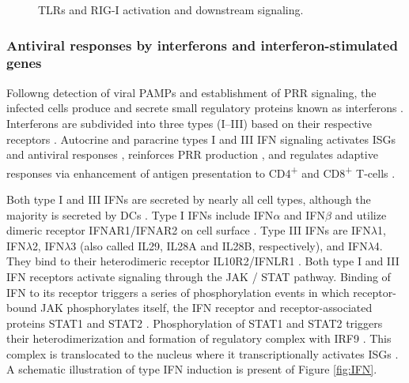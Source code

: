 		\begin{figure}[h]
			\centering
			\caption{\glspl{TLR} and \gls{RIG-I} activation and downstream signaling.} \label{fig:detection}
		\end{figure}	
		
		
		\subsubsection{Antiviral responses by interferons and interferon-stimulated genes}
		
		Followng detection of viral \gls{PAMP}s and establishment of \gls{PRR} signaling, the infected cells produce and secrete small regulatory proteins known as interferons \parencite{Fensterl2009}. Interferons are subdivided into three types (I--III) based on their respective receptors  \parencite{Branca1981, Sheppard2003}. Autocrine and paracrine types I and III \gls{IFN} signaling activates \gls{ISG}s and antiviral responses \parencite{Kotenko2003, Garcia-Sastre2006}, reinforces \gls{PRR} production \parencite{Pothlichet2013}, and regulates adaptive responses via enhancement of antigen presentation to CD4\textsuperscript{+} and CD8\textsuperscript{+} T-cells \parencite{Zietara2009}.
	
		Both type I and III \glspl{IFN} are secreted by nearly all cell types, although the majority is secreted by \glspl{DC} \parencite{Siegal1999, Odendall2014}. Type I \glspl{IFN} include \gls{IFN}$\alpha$ and \gls{IFN}$\beta$ and utilize dimeric receptor IFNAR1/IFNAR2 on cell surface \parencite{Mogensen1999}. Type III \glspl{IFN} are \gls{IFN}$\lambda$1, \gls{IFN}$\lambda$2, \gls{IFN}$\lambda$3 (also called \gls{IL}29, \gls{IL}28A and \gls{IL}28B, respectively), and \gls{IFN}$\lambda$4. They bind to their heterodimeric receptor IL10R2/IFNLR1 \parencite{Kotenko2003, Sheppard2003}. Both type I and III \gls{IFN} receptors activate signaling through the \gls{JAK} / \gls{STAT} pathway. Binding of \gls{IFN} to its receptor triggers a series of phosphorylation events in which receptor-bound \gls{JAK} phosphorylates itself, the \gls{IFN} receptor and receptor-associated proteins \gls{STAT}1 and \gls{STAT}2 \parencite{VanBoxel-Dezaire2006}. Phosphorylation of \gls{STAT}1 and \gls{STAT}2 triggers their heterodimerization and formation of regulatory complex with \gls{IRF}9 \parencite{Fu1990}. This complex is translocated to the nucleus where it transcriptionally activates \glspl{ISG} \parencite{Levy1988}. A schematic illustration of type \gls{IFN} induction is present of Figure \ref{fig:IFN}.
		
